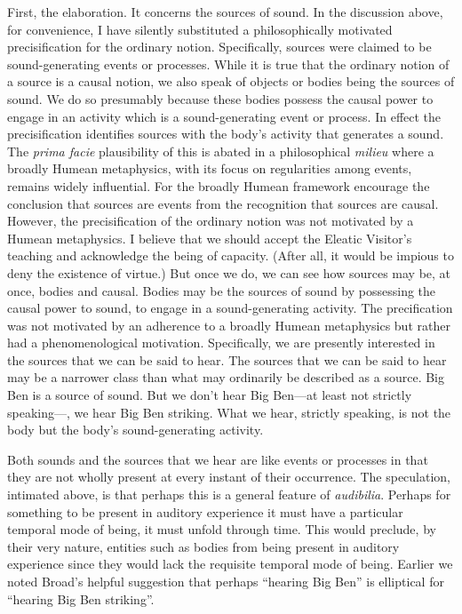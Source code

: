 First, the elaboration. It concerns the sources of sound. In the discussion above, for convenience, I have silently substituted a philosophically motivated precisification for the ordinary notion. Specifically, sources were claimed to be sound-generating events or processes. While it is true that the ordinary notion of a source is a causal notion, we also speak of objects or bodies being the sources of sound. We do so presumably because these bodies possess the causal power to engage in an activity which is a sound-generating event or process. In effect the precisification identifies sources with the body's activity that generates a sound. The \emph{prima facie} plausibility of this is abated in a philosophical \emph{milieu} where a broadly Humean metaphysics, with its focus on regularities among events, remains widely influential. For the broadly Humean framework encourage the conclusion that sources are events from the recognition that sources are causal. However, the precisification of the ordinary notion was not motivated by a Humean metaphysics. I believe that we should accept the Eleatic Visitor's teaching and acknowledge the being of capacity. (After all, it would be impious to deny the existence of virtue.) But once we do, we can see how sources may be, at once, bodies and causal. Bodies may be the sources of sound by possessing the causal power to sound, to engage in a sound-generating activity. The precification was not motivated by an adherence to a broadly Humean metaphysics but rather had a phenomenological motivation. Specifically, we are presently interested in the sources that we can be said to hear. The sources that we can be said to hear may be a narrower class than what may ordinarily be described as a source. Big Ben is a source of sound. But we don't hear Big Ben---at least not strictly speaking---, we hear Big Ben striking. What we hear, strictly speaking, is not the body but the body's sound-generating activity. 

Both sounds and the sources that we hear are like events or processes in that they are not wholly present at every instant of their occurrence. The speculation, intimated above, is that perhaps this is a general feature of \emph{audibilia}. Perhaps for something to be present in auditory experience it must have a particular temporal mode of being, it must unfold through time. This would preclude, by their very nature, entities such as bodies from being present in auditory experience since they would lack the requisite temporal mode of being. Earlier we noted Broad's helpful suggestion that perhaps ``hearing Big Ben'' is elliptical for ``hearing Big Ben striking''. 

